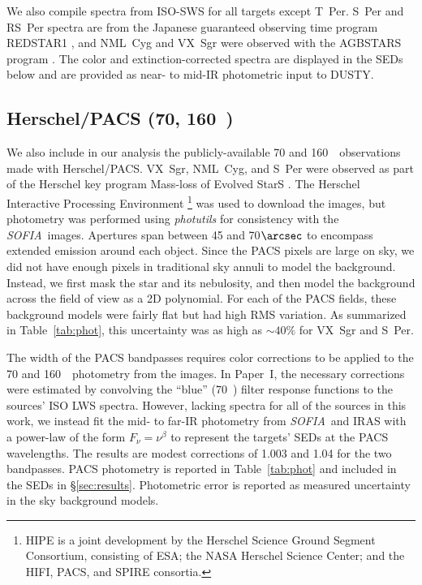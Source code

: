 \documentclass[modern]{aastex61}
\newcommand{\SOFIA}{{\it SOFIA}}
\begin{document}
We also compile spectra from ISO-SWS \citep{degraauw1996} for all targets except T~Per.  S~Per and RS~Per spectra are from the Japanese guaranteed observing time program REDSTAR1 \citep[PI T. Tsuji;][]{aoki1998}, and NML~Cyg and VX~Sgr were observed with the AGBSTARS program \citep{justtanont1996,speck2000}.  The color and extinction-corrected spectra are displayed in the SEDs below and are provided as near- to mid-IR photometric input to DUSTY.

\subsection{Herschel/PACS (70, 160~\micron)}
We also include in our analysis the publicly-available 70 and 160~\micron\ observations made with Herschel/PACS. VX~Sgr, NML~Cyg, and S~Per were observed as part of the Herschel key program Mass-loss of Evolved StarS \citep[MESS;][]{groenewegen2011}. The Herschel Interactive Processing Environment \citep[HIPE;][]{ott2010}\footnote{\footnotesize{HIPE is a joint development by the Herschel Science Ground Segment Consortium, consisting of ESA; the NASA Herschel Science Center; and the HIFI, PACS, and SPIRE consortia.}} was used to download the images, but photometry was performed using \textit{photutils} for consistency with the \SOFIA\ images. Apertures span between 45 and 70$\arcsec$ to encompass extended emission around each object.  Since the PACS pixels are large on sky, we did not have enough pixels in traditional sky annuli to model the background. Instead, we first mask the star and its nebulosity, and then model the background across the field of view as a 2D polynomial. For each of the PACS fields, these background models were fairly flat but had high RMS variation. As summarized in Table~\ref{tab:phot}, this uncertainty was as high as $\sim40\%$ for VX~Sgr and S~Per.

The width of the PACS bandpasses requires color corrections to be applied to the 70 and 160~\micron\ photometry from the images. In Paper~I, the necessary corrections were estimated by convolving the ``blue'' (70~\micron) filter response functions to the sources' ISO LWS spectra. However, lacking spectra for all of the sources in this work, we instead fit the mid- to far-IR photometry from \SOFIA\ and IRAS with a power-law of the form $F_\nu = \nu^\beta$ to represent the targets' SEDs at the PACS wavelengths. The results are modest corrections of 1.003 and 1.04 for the two bandpasses. PACS photometry is reported in Table~\ref{tab:phot} and included in the SEDs in \S\ref{sec:results}. Photometric error is reported as measured uncertainty in the sky background models.
\end{document}
